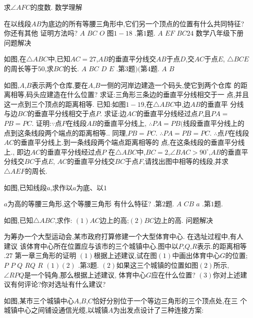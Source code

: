 \documentclass[cn,blue,12pt]{elegantbook}
\begin{document}
\begin{liti}[resume]
求\( \angle  AFC \)的度数. 
数学理解
\item 在以线段\( AB \)为底边的所有等腰三角形中,它们另一个顶点的位置有什么共同特征?
你还有其他
证明方法吗?
\(A\)
\(B C\)
\(O\)
图\( 1-18\)
.第\( 1 \)题.
\(A\)
\(E F\)
\(B C24\)
数学\(  \)八年级\(  \)下册
问题解决
\item 如图,在\( \triangle ABC \)中,已知\( AC = 27\),\( AB \)的垂直平分线交\( AB \)于点\( D\),交\( AC \)于点\( E\),
\( \triangle BCE \)的周长等于\( 50\),求\( BC \)的长. 
\(A\)
\(B C\)
\(D\)
\(E\)
.第\( 3 \)题\() ( \)第\( 4 \)题.
\(A\)
\(B\)
\item 如图,\( A\),\( B \)表示两个仓库,要在\( A\),\( B \)一侧的河岸边建造一个码头,使它到两个仓库
的距离相等,码头应建造在什么位置?
求证:三角形三条边的垂直平分线相交于一
点,并且这一点到三个顶点的距离相等. 
已知:如图\( 1-19\),在\( \triangle ABC \)中,边\( AB \)的垂直平
分线与边\( BC \)的垂直平分线相交于点\( P\). 
求证:边\( AC \)的垂直平分线经过点\( P\),且\( PA =\)
\(PB = PC\). 
证明:\( \because \)点\( P \)在线段\( AB \)的垂直平分线上,
\( \therefore PA = PB( \)线段垂直平分线上的点到这条线段两个端点的距离相等.. 
同理,\( PB = PC\). 
\( \therefore PA = PB = PC\). 
\( \therefore \)点\( P \)在线段\( AC \)的垂直平分线上.到一条线段两个端点距离相等的
点,在这条线段的垂直平分线上.,
即边\( AC \)的垂直平分线经过点\( P\)
在\( \triangle ABC \)中,\( BC = 2\),\( \angle  BAC > 90 ^\circ \),\( AB \)的垂直平分线交\( BC \)于点\( E\),
\(AC \)的垂直平分线交\( BC \)于点\( F\),请找出图中相等的线段,并求\( \triangle AEF \)的周长. 
\item 如图,已知线段\( a\),求作以\( a \)为底、以\( 1\)
\item \( a \)为高的等腰三角形,这个等腰三角形
有什么特征?
.第\( 2 \)题.
\(A\)
\(C B\)
\(a\)
.第\( 1 \)题.
\item 如图,已知\( \triangle ABC\),求作:
\(( 1) AC \)边上的高;\( ( 2) BC \)边上的高. 
问题解决
\item 为筹办一个大型运动会,某市政府打算修建一个大型体育中心. 在选址过程中,有人建议
该体育中心所在位置应与该市的三个城镇中心.图中以\( P\),\( Q\),\( R \)表示.的距离相等\(.27\)
第一章\(  \)三角形的证明
\(( 1) \)根据上述建议,试在图\(( 1) \)中画出体育中心\( G \)的位置;
\(P\)
\(P\)
\(Q\)
\(R Q\)
\(R\)
\(( 1) ( 2)\)
.第\( 3 \)题.
\(( 2) \)如果这三个城镇的位置如图\(( 2) \)所示,\( \angle  RPQ \)是一个钝角,那么根据上述建议,
体育中心\( G \)应在什么位置?
\(( 3) \)你对上述建议有何评论?你对选址有什么建议?
\item 如图,某市三个城镇中心\( A\),\( B\),\( C \)恰好分别位于一个等边三角形的三个顶点处,在三
个城镇中心之间铺设通信光缆,以城镇\( A \)为出发点设计了三种连接方案:

\end{liti}
\end{document}
